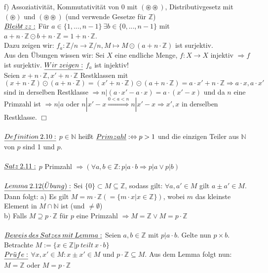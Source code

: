 \documentclass[fleqn, a4paper, 11pt]{article}
\begin{document}
f) Assoziativit\"at, Kommutativit\"at von $0$ mit $(\circledast\circledast)$, Distributivgesetz mit $(\circledast)$ und $(\circledast\circledast)$ (und verwende Gesetze f\"ur $\mathbb{Z}$)\\
$\uline{Bleibt\:zz:}$ F\"ur $a\in\{1,...,n-1\}\:\exists b\in\{0,...,n-1\}$ mit $a+n\cdot\mathbb{Z}\odot b+n\cdot\mathbb{Z}=1+n\cdot\mathbb{Z}$. \\
Dazu zeigen wir: $f_{a}:\mathbb{Z}/n\rightarrow\mathbb{Z}/n,M\mapsto M\odot(a+n\cdot\mathbb{Z})$ ist surjektiv.\\
Aus den \"Ubungen wissen wir: Sei $X$ eine endliche Menge, $f:X\rightarrow X$ injektiv $\Rightarrow f$ ist surjektiv. $\uline{Wir\:zeigen:}$ $f_{a}$ ist injektiv!\\
Seien $x+n\cdot\mathbb{Z},x'+n\cdot\mathbb{Z}$ Restklassen mit $(x+n\cdot\mathbb{Z})\odot(a+n\cdot\mathbb{Z})=(x'+n\cdot\mathbb{Z})\odot(a+n\cdot\mathbb{Z})=a\cdot x'+n\cdot\mathbb{Z}\Rightarrow a\cdot x,a\cdot x'$ sind in derselben Restklasse $\Rightarrow n|(a\cdot x'-a\cdot x)=a\cdot (x'-x)$ und da $n$ eine Primzahl ist $\Rightarrow n|a$ oder $n|x'-x \stackrel{0<a<n}{\Rightarrow} n|x'-x\Rightarrow x',x$ in derselben Restklasse. \hfill $\Box$\\ 
\\
$\uline{Definition\:2.10:}$ $p\in\mathbb{N}$ hei\ss{}t $\uline{Primzahl}:\Leftrightarrow p>1$ und die einzigen Teiler aus $\mathbb{N}$ von $p$ sind 1 und $p$.\\
\\
$\uline{Satz\:2.11:}$ $p$ Primzahl $\Rightarrow(\forall a,b\in\mathbb{Z}:p|a\cdot b\Rightarrow p|a\vee p|b)$\\
\\
$\uline{Lemma\:2.12(\ddot{U}bung):}$ Sei $\{0\}\subset M\subseteq\mathbb{Z}$, sodass gilt: $\forall a,a'\in M$ gilt $a\pm a'\in M$. Dann folgt: a) Es gilt $M=m\cdot\mathbb{Z}(=\{m\cdot x|x\in \mathbb{Z}\})$, wobei $m$ das kleinste Element in $M\cap\mathbb{N}$ ist (und $\neq\emptyset$)\\
b) Falls $M\supseteq p\cdot\mathbb{Z}$ f\"ur $p$ eine Primzahl $\Rightarrow M=\mathbb{Z}\vee M=p\cdot \mathbb{Z}$\\
\\
$\uline{Beweis\:des\:Satzes\:mit\:Lemma:}$ Seien $a,b\in\mathbb{Z}$ mit $p|a\cdot b$. Gelte nun $p\times b$. Betrachte $M:=\{x\in\mathbb{Z}|p\:teilt\:x\cdot b\}$\\
$\uline{Pr\ddot{u}fe:}$ $\forall x,x'\in M:x\pm x'\in M$ und $p\cdot\mathbb{Z}\subseteq M$. Aus dem Lemma folgt nun: $M=\mathbb{Z}$ oder $M=p\cdot\mathbb{Z}$\\
\end{document}
